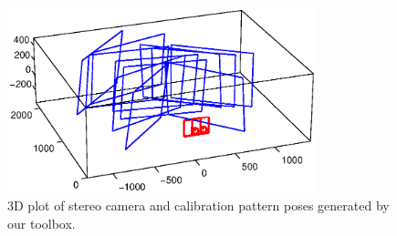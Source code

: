 \documentclass{report}
\begin{document}
\begin{figure}
\centering
\includegraphics[trim=0in 0.1in 0in 0in, clip=true, width = 0.8\textwidth]{images/stereo3dbold}
\caption{3D plot of stereo camera and calibration pattern poses generated by our toolbox.}
\label{stereoPlot}
\end{figure}
\end{document}
